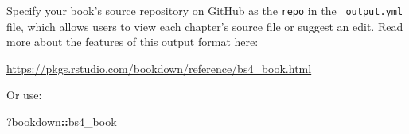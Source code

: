 \documentclass[
]{report}
\newenvironment{Shaded}{\begin{snugshade}}{\end{snugshade}}
\newcommand{\NormalTok}[1]{#1}
\newcommand{\SpecialCharTok}[1]{\textcolor[rgb]{0.81,0.36,0.00}{\textbf{#1}}}
\theoremstyle{definition}
\theoremstyle{definition}
\theoremstyle{definition}
\theoremstyle{definition}
\theoremstyle{remark}
\begin{document}
Specify your book's source repository on GitHub as the \texttt{repo} in the \texttt{\_output.yml} file, which allows users to view each chapter's source file or suggest an edit. Read more about the features of this output format here:

\url{https://pkgs.rstudio.com/bookdown/reference/bs4_book.html}

Or use:

\begin{Shaded}
\begin{Highlighting}[]
\NormalTok{?bookdown}\SpecialCharTok{::}\NormalTok{bs4\_book}
\end{Highlighting}
\end{Shaded}


  
\end{document}

